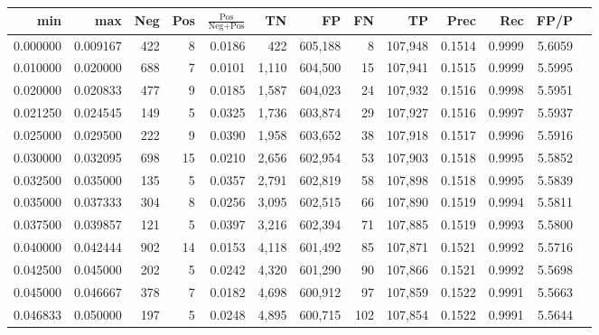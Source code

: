 \begin{tabular}{rrrrrrrrrrrrr}
\toprule
     min &      max &   Neg & Pos & $\frac{\text{Pos}}{\text{Neg}+\text{Pos}}$ &      TN &      FP &      FN &      TP &   Prec &    Rec &   FP/P \\
\midrule
0.000000 & 0.009167 &   422 &   8 &                                     0.0186 &     422 & 605,188 &       8 & 107,948 & 0.1514 & 0.9999 & 5.6059 \\
0.010000 & 0.020000 &   688 &   7 &                                     0.0101 &   1,110 & 604,500 &      15 & 107,941 & 0.1515 & 0.9999 & 5.5995 \\
0.020000 & 0.020833 &   477 &   9 &                                     0.0185 &   1,587 & 604,023 &      24 & 107,932 & 0.1516 & 0.9998 & 5.5951 \\
0.021250 & 0.024545 &   149 &   5 &                                     0.0325 &   1,736 & 603,874 &      29 & 107,927 & 0.1516 & 0.9997 & 5.5937 \\
0.025000 & 0.029500 &   222 &   9 &                                     0.0390 &   1,958 & 603,652 &      38 & 107,918 & 0.1517 & 0.9996 & 5.5916 \\
0.030000 & 0.032095 &   698 &  15 &                                     0.0210 &   2,656 & 602,954 &      53 & 107,903 & 0.1518 & 0.9995 & 5.5852 \\
0.032500 & 0.035000 &   135 &   5 &                                     0.0357 &   2,791 & 602,819 &      58 & 107,898 & 0.1518 & 0.9995 & 5.5839 \\
0.035000 & 0.037333 &   304 &   8 &                                     0.0256 &   3,095 & 602,515 &      66 & 107,890 & 0.1519 & 0.9994 & 5.5811 \\
0.037500 & 0.039857 &   121 &   5 &                                     0.0397 &   3,216 & 602,394 &      71 & 107,885 & 0.1519 & 0.9993 & 5.5800 \\
0.040000 & 0.042444 &   902 &  14 &                                     0.0153 &   4,118 & 601,492 &      85 & 107,871 & 0.1521 & 0.9992 & 5.5716 \\
0.042500 & 0.045000 &   202 &   5 &                                     0.0242 &   4,320 & 601,290 &      90 & 107,866 & 0.1521 & 0.9992 & 5.5698 \\
0.045000 & 0.046667 &   378 &   7 &                                     0.0182 &   4,698 & 600,912 &      97 & 107,859 & 0.1522 & 0.9991 & 5.5663 \\
0.046833 & 0.050000 &   197 &   5 &                                     0.0248 &   4,895 & 600,715 &     102 & 107,854 & 0.1522 & 0.9991 & 5.5644 \\

\end{tabular}
